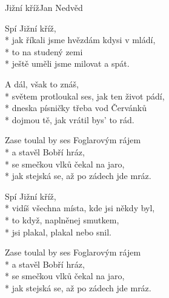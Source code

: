 \documentclass[10.5pt]{book}
\begin{document}
\begin{poem}{Jižní kříž}{Jan Nedvěd}

\settowidth{\versewidth}{světem protloukal ses, jak ten život pádí,}

Spí Jižní kříž,\\*
jak říkali jsme hvězdám kdysi v mládí,\\*
to na studený zemi\\*
ještě uměli jsme milovat a spát.

A dál, však to znáš,\\*
světem protloukal ses, jak ten život pádí,\\*
dneska písničky třeba vod Červánků\\*
dojmou tě, jak vrátil bys' to rád.

Zase toulal by ses Foglarovým rájem\\*
a stavěl Bobří hráz,\\*
se smečkou vlků čekal na jaro,\\*
jak stejská se, až po zádech jde mráz.

Spí Jižní kříž,\\*
vidíš všechna místa, kde jsi někdy byl,\\*
to když, naplněnej smutkem,\\*
jsi plakal, plakal nebo snil.

Zase toulal by ses Foglarovým rájem\\*
a stavěl Bobří hráz,\\*
se smečkou vlků čekal na jaro,\\*
jak stejská se, až po zádech jde mráz.
\end{poem}
\end{document}
